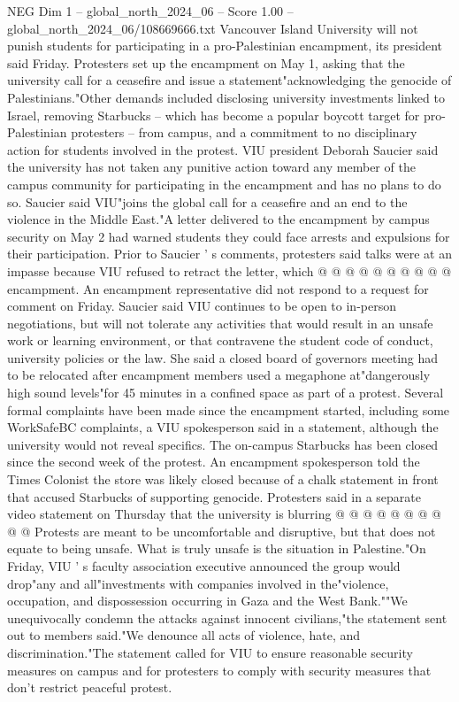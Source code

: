 \begin{textsample}{NEG Dim 1 – global\_north\_2024\_06 – Score 1.00 – global\_north\_2024\_06/108669666.txt}  \label{ex:f1_neg_141}
Vancouver Island University will not punish students for participating in a pro-Palestinian encampment, its president said Friday.
Protesters set up the encampment on May 1, asking that the university call for a ceasefire and issue a statement"acknowledging the genocide of Palestinians."Other demands included disclosing university investments linked to Israel, removing Starbucks -- which has become a popular boycott target for pro-Palestinian protesters -- from campus, and a commitment to no disciplinary action for students involved in the protest.
VIU president Deborah Saucier said the university has not taken any punitive action toward any member of the campus community for participating in the encampment and has no plans to do so.
Saucier said VIU"joins the global call for a ceasefire and an end to the violence in the Middle East."A letter delivered to the encampment by campus security on May 2 had warned students they could face arrests and expulsions for their participation.
Prior to Saucier ' s comments, protesters said talks were at an impasse because VIU refused to retract the letter, which @ @ @ @ @ @ @ @ @ @ encampment.
An encampment representative did not respond to a request for comment on Friday.
Saucier said VIU continues to be open to in-person negotiations, but will not tolerate any activities that would result in an unsafe work or learning environment, or that contravene the student code of conduct, university policies or the law.
She said a closed board of governors meeting had to be relocated after encampment members used a megaphone at"dangerously high sound levels"for 45 minutes in a confined space as part of a protest.
Several formal complaints have been made since the encampment started, including some WorkSafeBC complaints, a VIU spokesperson said in a statement, although the university would not reveal specifics.
The on-campus Starbucks has been closed since the second week of the protest.
An encampment spokesperson told the Times Colonist the store was likely closed because of a chalk statement in front that accused Starbucks of supporting genocide.
Protesters said in a separate video statement on Thursday that the university is blurring @ @ @ @ @ @ @ @ @ @ Protests are meant to be uncomfortable and disruptive, but that does not equate to being unsafe.
What is truly unsafe is the situation in Palestine."On Friday, VIU ' s faculty association executive announced the group would drop"any and all"investments with companies involved in the"violence, occupation, and dispossession occurring in Gaza and the West Bank.""We unequivocally condemn the attacks against innocent civilians,"the statement sent out to members said."We denounce all acts of violence, hate, and discrimination."The statement called for VIU to ensure reasonable security measures on campus and for protesters to comply with security measures that don't restrict peaceful protest.

\end{textsample}
